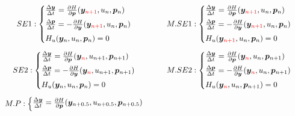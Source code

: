 \documentclass[a4paper, 10pt]{article}
\begin{document}
\begin{equation}
\begin{array}{c@{\hspace{2em}}c}
SE1: \begin{cases}
            \frac{\Delta\bm{y}}{\Delta t} = \frac{\partial H}{\partial \bm{p}}(\bm{y}_{{\color{red}n+1}}, u_n, \bm{p}_n) \\[4pt]
            \frac{\Delta\bm{p}}{\Delta t} = -\frac{\partial H}{\partial \bm{y}}(\bm{y}_{\color{red}{n+1}}, u_n, \bm{p}_n) \\[4pt]
            H_{u} (\bm{y}_n,u_n,\bm{p}_n)= 0
        \end{cases}  &  M.SE1: \begin{cases}
            \frac{\Delta\bm{y}}{\Delta t} = \frac{\partial H}{\partial \bm{p}}(\bm{y}_{\color{red}n+1}, u_n, \bm{p}_n) \\[4pt]
            \frac{\Delta\bm{p}}{\Delta t} = -\frac{\partial H}{\partial \bm{y}}(\bm{y}_{\color{red}n+1}, u_n, \bm{p}_n) \\[4pt]
            H_{u} (\bm{y}_{\color{red}n+1}, u_{n}, \bm{p}_{n})= 0
        \end{cases} \\[28pt]
SE2: \begin{cases}
            \frac{\Delta\bm{y}}{\Delta t} = \frac{\partial H}{\partial \bm{p}}(\bm{y}_{\color{red}{n}}, u_{n+1}, \bm{p}_{n+1}) \\[4pt]
            \frac{\Delta\bm{p}}{\Delta t} = -\frac{\partial H}{\partial \bm{y}}(\bm{y}_{{\color{red}{n}}}, u_{n+1}, \bm{p}_{n+1}) \\[4pt]
            H_{u}(\bm{y}_{n},u_{n},\bm{p}_{n}) = 0
        \end{cases} &   M.SE2:
        \begin{cases}
            \frac{\Delta\bm{y}}{\Delta t} = \frac{\partial H}{\partial \bm{p}}(\bm{y}_{\color{red}n}, u_{n}, \bm{p}_{n+1}) \\[4pt]
             \frac{\Delta\bm{p}}{\Delta t} = -\frac{\partial H}{\partial \bm{y}}(\bm{y}_{\color{red}n}, u_{n}, \bm{p}_{n+1}) \\[4pt]
             H_{u} (\bm{y}_{\color{red}n}, u_{n}, \bm{p}_{n+1})= 0
        \end{cases} \\[28pt]
        M.P:
        \begin{cases}
            \frac{\Delta\bm{y}}{\Delta t} = \frac{\partial H}{\partial \bm{p}}(\bm{y}_{n+0.5}, u_{n+0.5}, \bm{p}_{n+0.5}) \\[4pt]

\end{cases}
\end{array}
\end{equation}
\end{document}

